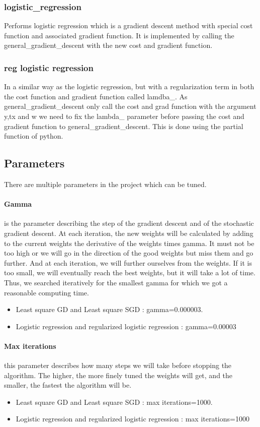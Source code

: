 \documentclass[10pt,conference,compsocconf]{IEEEtran}
\begin{document}
\subsubsection{logistic\_regression}
Performs logistic regression which is a gradient descent method with special cost function and associated gradient function. It is implemented by calling the general\_gradient\_descent with the new cost and gradient function.

\subsubsection{reg logistic regression}
In a similar way as the logistic regression, but with a regularization term in both the cost function and gradient function called lamdba\_. As general\_gradient\_descent only call the cost and grad function with the argument y,tx and w we need to fix the lambda\_ parameter before passing the cost and gradient function to general\_gradient\_descent. This is done using the partial function of python.

\subsection{Parameters}
There are multiple parameters in the project which can be tuned. 
\paragraph{Gamma} is the parameter describing the step of the gradient descent and of the stochastic gradient descent. At each iteration, the new weights will be calculated by adding to the current weights the derivative of the weights times gamma. It must not be too high or we will go in the direction of the good weights but miss them and go further. And at each iteration, we will further ourselves from the weights. If it is too small, we will eventually reach the best weights, but it will take a lot of time. Thus, we searched iteratively for the smallest gamma for which we got a reasonable computing time.
\begin{itemize}
\item Least square GD and Least square SGD : gamma=0.000003.
\item Logistic regression and regularized logistic regression : gamma=0.00003
\end{itemize}
\paragraph{Max iterations} this parameter describes how many steps we will take before stopping the algorithm. The higher, the more finely tuned the weights will get, and the smaller, the fastest the algorithm will be. 
\begin{itemize}
\item Least square GD and Least square SGD : max iterations=1000.
\item Logistic regression and regularized logistic regression :  max iterations=1000
\end{itemize}
\end{document}

